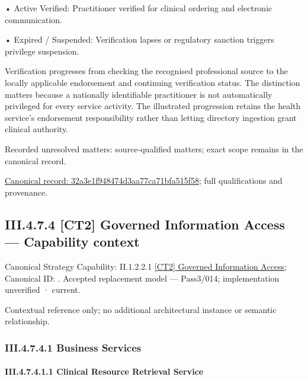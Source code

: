 •
Active Verified: Practitioner verified for clinical ordering and electronic communication.



•
Expired / Suspended: Verification lapses or regulatory sanction triggers privilege suspension.



Verification progresses from checking the recognised professional source to the locally applicable endorsement and continuing verification status. The distinction matters because a nationally identifiable practitioner is not automatically privileged for every service activity. The illustrated progression retains the health service's endorsement responsibility rather than letting directory ingestion grant clinical authority.


{\small Recorded unresolved matters: source-qualified matters; exact scope remains in the canonical record.}\par
{\footnotesize \href{../../../../continuum/business/business-process/32a3e1f948474d3aa77ca71bfa515f58.md}{Canonical record: 32a3e1f948474d3aa77ca71bfa515f58}; full qualifications and provenance.}\par
\subsection*{III.4.7.4 [CT2] Governed Information Access — Capability context}
\label{navigation:III.4.7.4}

{\small Canonical Strategy Capability: II.1.2.2.1 \hyperref[element:43146a505617462f96c38459b465bcf1]{[CT2] Governed Information Access}; Canonical ID: \texttt{}. Accepted replacement model — Pass3/014; implementation unverified · current.}\par
Contextual reference only; no additional architectural instance or semantic relationship.\par
\subsubsection*{III.4.7.4.1 Business Services}
\label{navigation:III.4.7.4.1}

\paragraph*{III.4.7.4.1.1 Clinical Resource Retrieval Service}
\label{navigation:III.4.7.4.1.1}

